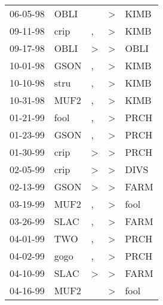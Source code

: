 \begin{supertabular}{p{0.07\textwidth}p{0.06\textwidth}p{0.02\textwidth}p{0.02\textwidth}p{0.06\textwidth}}
 06-05-98\textsuperscript{} &  OBLI\textsuperscript{} &               &  \textgreater &  KIMB\textsuperscript{} \\
 09-11-98\textsuperscript{} &  crip\textsuperscript{} &             , &  \textgreater &  KIMB\textsuperscript{} \\
 09-17-98\textsuperscript{} &  OBLI\textsuperscript{} &  \textgreater &  \textgreater &  OBLI\textsuperscript{} \\
 10-01-98\textsuperscript{} &  GSON\textsuperscript{} &             , &  \textgreater &  KIMB\textsuperscript{} \\
 10-10-98\textsuperscript{} &  stru\textsuperscript{} &             , &  \textgreater &  KIMB\textsuperscript{} \\
 10-31-98\textsuperscript{} &  MUF2\textsuperscript{} &             , &  \textgreater &  KIMB\textsuperscript{} \\
 01-21-99\textsuperscript{} &  fool\textsuperscript{} &             , &  \textgreater &  PRCH\textsuperscript{} \\
 01-23-99\textsuperscript{} &  GSON\textsuperscript{} &             , &  \textgreater &  PRCH\textsuperscript{} \\
 01-30-99\textsuperscript{} &  crip\textsuperscript{} &  \textgreater &  \textgreater &  PRCH\textsuperscript{} \\
 02-05-99\textsuperscript{} &  crip\textsuperscript{} &  \textgreater &  \textgreater &  DIVS\textsuperscript{} \\
 02-13-99\textsuperscript{} &  GSON\textsuperscript{} &  \textgreater &  \textgreater &  FARM\textsuperscript{} \\
 03-19-99\textsuperscript{} &  MUF2\textsuperscript{} &             , &  \textgreater &  fool\textsuperscript{} \\
 03-26-99\textsuperscript{} &  SLAC\textsuperscript{} &             , &  \textgreater &  FARM\textsuperscript{} \\
 04-01-99\textsuperscript{} &   TWO\textsuperscript{} &             , &  \textgreater &  PRCH\textsuperscript{} \\
 04-02-99\textsuperscript{} &  gogo\textsuperscript{} &             , &  \textgreater &  PRCH\textsuperscript{} \\
 04-10-99\textsuperscript{} &  SLAC\textsuperscript{} &  \textgreater &  \textgreater &  FARM\textsuperscript{} \\
 04-16-99\textsuperscript{} &  MUF2\textsuperscript{} &               &  \textgreater &  fool\textsuperscript{} \\

\end{supertabular}
